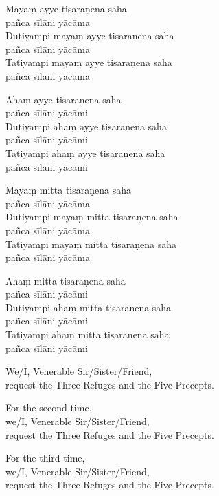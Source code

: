
Mayaṃ ayye tisaraṇena saha\\\vin pañca sīlāni yācāma\\
Dutiyampi mayaṃ ayye tisaraṇena saha\\\vin pañca sīlāni yācāma\\
Tatiyampi mayaṃ ayye tisaraṇena saha\\\vin pañca sīlāni yācāma


Ahaṃ ayye tisaraṇena saha\\\vin pañca sīlāni yācāmi\\
Dutiyampi ahaṃ ayye tisaraṇena saha\\\vin pañca sīlāni yācāmi\\
Tatiyampi ahaṃ ayye tisaraṇena saha\\\vin pañca sīlāni yācāmi


Mayaṃ mitta tisaraṇena saha\\\vin pañca sīlāni yācāma\\
Dutiyampi mayaṃ mitta tisaraṇena saha\\\vin pañca sīlāni yācāma\\
Tatiyampi mayaṃ mitta tisaraṇena saha\\\vin pañca sīlāni yācāma

\ifhandbookedition
\enlargethispage{\baselineskip}
\fi


Ahaṃ mitta tisaraṇena saha\\\vin pañca sīlāni yācāmi\\
Dutiyampi ahaṃ mitta tisaraṇena saha\\\vin pañca sīlāni yācāmi\\
Tatiyampi ahaṃ mitta tisaraṇena saha\\\vin pañca sīlāni yācāmi

\begin{english}
  We/I, Venerable Sir/Sister/Friend,\\
  request the Three Refuges and the Five Precepts.

  For the second time,\\
  we/I, Venerable Sir/Sister/Friend,\\
  request the Three Refuges and the Five Precepts.

  For the third time,\\
  we/I, Venerable Sir/Sister/Friend,\\
  request the Three Refuges and the Five Precepts.
\end{english}

